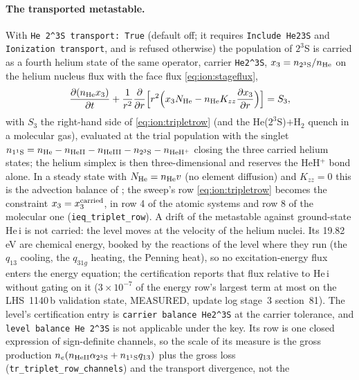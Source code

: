 \paragraph{The transported metastable.} With \texttt{He 2\^{}3S transport:
True} (default off; it requires \texttt{Include He23S} and \texttt{Ionization
transport}, and is refused otherwise) the population of $2^3$S is carried as
a fourth helium state of the same operator, carrier \texttt{He2\^{}3S},
$x_3 = n_{2^3{\rm S}}/n_{\rm He}$ on the helium nucleus flux with the face flux
\eqref{eq:ion:stageflux},
\begin{equation}
\frac{\partial (n_{\rm He}x_3)}{\partial t}
 + \frac{1}{r^2}\frac{\partial}{\partial r}\Bigl[r^2\Bigl(x_3N_{\rm He}
   - n_{\rm He}K_{zz}\frac{\partial x_3}{\partial r}\Bigr)\Bigr]
 = S_3 ,
\label{eq:ion:triplettransport}
\end{equation}
with $S_3$ the right-hand side of \eqref{eq:ion:tripletrow} (and the
He($2^3$S)$+$H$_2$ quench in a molecular gas), evaluated at the trial
population with the singlet $n_{1^1{\rm S}} = n_{\rm He} - n_{\rm HeII} -
n_{\rm HeIII} - n_{2^3{\rm S}} - n_{\rm HeH^+}$ closing the three carried
helium states; the helium simplex is then three-dimensional and reserves the
HeH$^+$ bond alone. In a steady state with $N_{\rm He} = n_{\rm He}v$ (no
element diffusion) and $K_{zz}=0$ this is the advection balance of
\citet[eq.~15]{Oklopcic2018}; the sweep's row
\eqref{eq:ion:tripletrow} becomes the constraint $x_3 = x_3^{\rm carried}$,
in row 4 of the atomic systems and row 8 of the molecular one
(\texttt{ieq\_triplet\_row}). A drift of the metastable against ground-state
He\,{\sc i} is not carried: the level moves at the velocity of the helium
nuclei. Its 19.82\,eV are chemical energy, booked by the reactions of the
level where they run (the $q_{13}$ cooling, the $q_{31g}$ heating, the Penning
heat), so no excitation-energy flux enters the energy equation; the
certification reports that flux relative to He\,{\sc i} without gating on it
($3\times10^{-7}$ of the energy row's largest term at most on the LHS~1140\,b
validation state, MEASURED, update log stage~3 section~81). The level's
certification entry is \texttt{carrier balance He2\^{}3S} at the carrier
tolerance, and \texttt{level balance He 2\^{}3S} is not applicable under the
key. Its row is one closed expression of sign-definite channels, so the scale
of its measure is the gross production
$n_e(n_{\rm HeII}\alpha_{2^3{\rm S}}+n_{1^1{\rm S}}q_{13})$ plus the gross loss
(\texttt{tr\_triplet\_row\_channels}) and the transport divergence, not the
